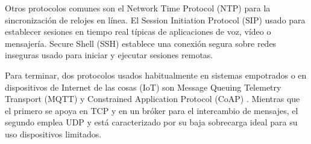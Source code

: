 \begin{description}
  Otros protocolos comunes son el Network Time Protocol (NTP) \cite{rfc5905}
  para la sincronización de relojes en línea. El Session Initiation Protocol
  (SIP) \cite{rfc3261} usado para establecer sesiones en tiempo real típicas de
  aplicaciones de voz, vídeo o mensajería. Secure Shell (SSH) \cite{rfc4253}
  establece una conexión segura sobre redes inseguras usado para iniciar y
  ejecutar sesiones remotas.

  Para terminar, dos protocolos usados habitualmente en sistemas empotrados o
  en dispositivos de Internet de las cosas (IoT) son Message Queuing Telemetry 
  Transport (MQTT) \cite{bank15} y Constrained Application Protocol (CoAP)
  \cite{rfc7252}. Mientras que el primero se apoya en TCP y en un bróker para
  el intercambio de mensajes, el segundo emplea UDP y está caracterizado por su
  baja sobrecarga ideal para su uso dispositivos limitados.
\end{description}
